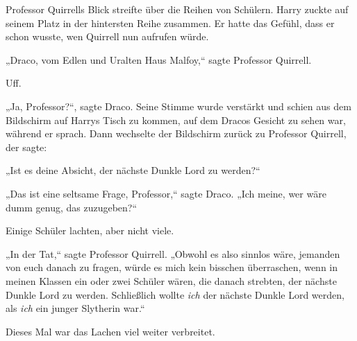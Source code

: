 Professor Quirrells Blick streifte über die Reihen von Schülern. Harry zuckte auf seinem Platz in der hintersten Reihe zusammen. Er hatte das Gefühl, dass er schon wusste, wen Quirrell nun aufrufen würde.

„Draco, vom Edlen und Uralten Haus Malfoy,“ sagte Professor Quirrell.

Uff.

„Ja, Professor?“, sagte Draco. Seine Stimme wurde verstärkt und schien aus dem Bildschirm auf Harrys Tisch zu kommen, auf dem Dracos Gesicht zu sehen war, während er sprach. Dann wechselte der Bildschirm zurück zu Professor Quirrell, der sagte:

„Ist es deine Absicht, der nächste Dunkle Lord zu werden?“

„Das ist eine seltsame Frage, Professor,“ sagte Draco. „Ich meine, wer wäre dumm genug, das zuzugeben?“

Einige Schüler lachten, aber nicht viele.

„In der Tat,“ sagte Professor Quirrell. „Obwohl es also sinnlos wäre, jemanden von euch danach zu fragen, würde es mich kein bisschen überraschen, wenn in meinen Klassen ein oder zwei Schüler wären, die danach strebten, der nächste Dunkle Lord zu werden. Schließlich wollte \emph{ich} der nächste Dunkle Lord werden, als \emph{ich} ein junger Slytherin war.“

Dieses Mal war das Lachen viel weiter verbreitet.


